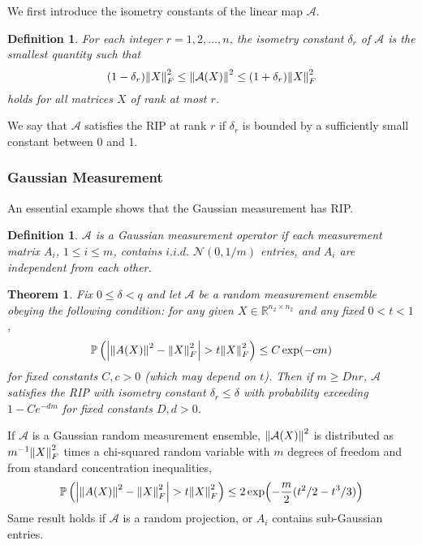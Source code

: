 \documentclass[10pt]{article}  %
\theoremstyle{plain}
\newtheorem{theorem}{Theorem}[section]
\newtheorem{definition}[thm]{Definition}
\numberwithin{equation}{section}
\def\mN{\mathcal{N}}
\def\mA{\mathcal{A}}
\def\R{\mathbb{R}}
\begin{document}
We first introduce the isometry constants of the linear map $\mA$. 
\begin{definition}
	For each integer $r = 1, 2, \dots , n$, the isometry constant $\delta_r$ of $\mA$ is the smallest quantity such that 
	\begin{equation}
		(1 - \delta_r)\norm{X}_F^2 \leq \norm{\mA(X)}^2 \leq (1 + \delta_r) \norm{X}_F^2
	\end{equation}
	holds for all matrices $X$ of rank at most $r$. 
\end{definition}
We say that $\mA$ satisfies the RIP at rank $r$ if $\delta_r$ is bounded by a sufficiently small constant between 0 and 1. 



\subsubsection{Gaussian Measurement}
An essential example shows that the Gaussian measurement has RIP.
\begin{definition}
	$\mA$ is a Gaussian measurement operator if each measurement matrix $A_i$, $1 \leq i \leq m$, contains $i.i.d.$ $\mN(0, 1/m)$ entries, and $A_i$ are independent from each other. 
\end{definition}

\begin{theorem}\cite[Theorem 2.3]{candesTightOracleBounds}
	Fix $0 \leq \delta < q$ and let $\mA$ be a random measurement ensemble obeying the following condition: for any given $X \in \R^{n_2 \times n_2}$ and any fixed $0 < t < 1$, 
	\begin{equation}
		\mathbb{P}\left(\abs{\norm{A(X)}^2 - \norm{X}^2_F} > t \norm{X}^2_F\right) \leq C\exp(-cm)
	\end{equation}
	for fixed constants $C, c > 0$ (which may depend on $t$). Then if $m \geq Dnr$, $\mA$ satisfies the RIP with isometry constant $\delta_r \leq \delta$ with probability exceeding $1 - Ce^{-dm}$ for fixed constants $D, d >0$. 
\end{theorem}

If $\mA$ is a Gaussian random measurement ensemble, $\norm{\mA(X)}^2$ is distributed as $m^{-1}\norm{X}^2_F$ times a chi-squared random variable with $m$ degrees of freedom and from standard concentration inequalities, \\
\begin{equation}
	\mathbb{P}\left(\abs{\norm{A(X)}^2 - \norm{X}^2_F} > t \norm{X}^2_F\right) \leq 2\exp(-\frac{m}{2}(t^2/2 - t^3/3))
\end{equation}
Same result holds if $\mA$ is a random projection, or $A_i$ contains sub-Gaussian entries.
\end{document}
